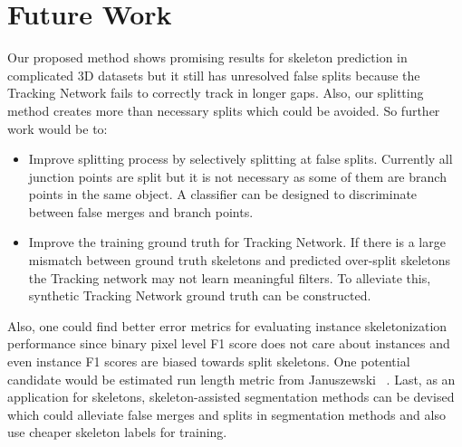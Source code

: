 
\chapter{Future Work}\label{chapter:further_work}
Our proposed method shows promising results for skeleton prediction in complicated 3D datasets but it still has unresolved false splits because the Tracking Network fails to correctly track in longer gaps. Also, our splitting method creates more than necessary splits which could be avoided. So further work would be to:
\begin{itemize}
	\item Improve splitting process by selectively splitting at false splits. Currently all junction points are split but it is not necessary as some of them are branch points in the same object. A classifier can be designed to discriminate between false merges and branch points.
	
	\item Improve the training ground truth for Tracking Network. If there is a large mismatch between ground truth skeletons and predicted over-split skeletons the Tracking network may not learn meaningful filters. To alleviate this, synthetic Tracking Network ground truth can be constructed.
	
\end{itemize}

Also, one could find better error metrics for evaluating instance skeletonization performance since binary pixel level F1 score does not care about instances and even instance F1 scores are biased towards split skeletons. One potential candidate would be estimated run length metric from Januszewski \etall~\cite{Januszewski2017FFN, Januszewski2018FFN}.
Last, as an application for skeletons, skeleton-assisted segmentation methods can be devised which could alleviate false merges and splits in segmentation methods and also use cheaper skeleton labels for training.
